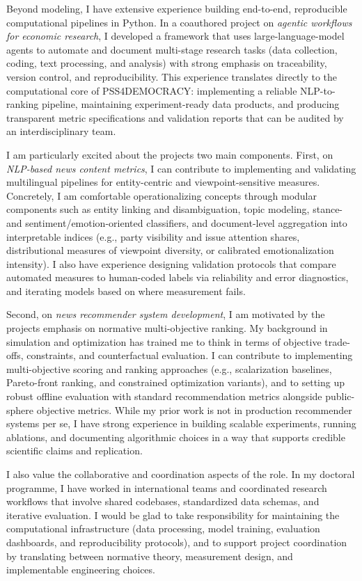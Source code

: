 \documentclass[11pt]{article}
\begin{document}
Beyond modeling, I have extensive experience building end-to-end, reproducible computational pipelines in Python. In a coauthored project on \textit{agentic workflows for economic research}, I developed a framework that uses large-language-model agents to automate and document multi-stage research tasks (data collection, coding, text processing, and analysis) with strong emphasis on traceability, version control, and reproducibility. This experience translates directly to the computational core of PSS4DEMOCRACY: implementing a reliable NLP-to-ranking pipeline, maintaining experiment-ready data products, and producing transparent metric specifications and validation reports that can be audited by an interdisciplinary team.

I am particularly excited about the project\textquotesingle s two main components. First, on \textit{NLP-based news content metrics}, I can contribute to implementing and validating multilingual pipelines for entity-centric and viewpoint-sensitive measures. Concretely, I am comfortable operationalizing concepts through modular components such as entity linking and disambiguation, topic modeling, stance- and sentiment/emotion-oriented classifiers, and document-level aggregation into interpretable indices (e.g., party visibility and issue attention shares, distributional measures of viewpoint diversity, or calibrated emotionalization intensity). I also have experience designing validation protocols that compare automated measures to human-coded labels via reliability and error diagnostics, and iterating models based on where measurement fails.

Second, on \textit{news recommender system development}, I am motivated by the project\textquotesingle s emphasis on normative multi-objective ranking. My background in simulation and optimization has trained me to think in terms of objective trade-offs, constraints, and counterfactual evaluation. I can contribute to implementing multi-objective scoring and ranking approaches (e.g., scalarization baselines, Pareto-front ranking, and constrained optimization variants), and to setting up robust offline evaluation with standard recommendation metrics alongside public-sphere objective metrics. While my prior work is not in production recommender systems per se, I have strong experience in building scalable experiments, running ablations, and documenting algorithmic choices in a way that supports credible scientific claims and replication.

I also value the collaborative and coordination aspects of the role. In my doctoral programme, I have worked in international teams and coordinated research workflows that involve shared codebases, standardized data schemas, and iterative evaluation. I would be glad to take responsibility for maintaining the computational infrastructure (data processing, model training, evaluation dashboards, and reproducibility protocols), and to support project coordination by translating between normative theory, measurement design, and implementable engineering choices.
\end{document}
